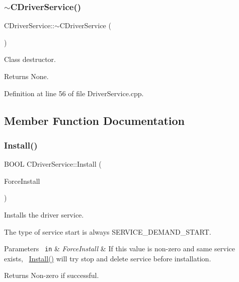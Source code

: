 \mbox{\label{class_c_driver_service_af5f00554519b7d44fe12fc9a7c968718}} 
\subsubsection{\texorpdfstring{$\sim$CDriverService()}{~CDriverService()}}
{\footnotesize\ttfamily C\+Driver\+Service\+::$\sim$\+C\+Driver\+Service (\begin{DoxyParamCaption}\item[{void}]{ }\end{DoxyParamCaption})}



Class destructor. 

\begin{DoxyReturn}{Returns}
None. 
\end{DoxyReturn}


Definition at line 56 of file Driver\+Service.\+cpp.



\subsection{Member Function Documentation}
\mbox{\label{class_c_driver_service_a82ac4ca0202256a3f27c3d38a60a8d37}} 
\subsubsection{\texorpdfstring{Install()}{Install()}}
{\footnotesize\ttfamily B\+O\+OL C\+Driver\+Service\+::\+Install (\begin{DoxyParamCaption}\item[{B\+O\+OL}]{Force\+Install }\end{DoxyParamCaption})}



Installs the driver service. 

The type of service start is always S\+E\+R\+V\+I\+C\+E\+\_\+\+D\+E\+M\+A\+N\+D\+\_\+\+S\+T\+A\+RT.


\begin{DoxyParams}[1]{Parameters}
\mbox{\texttt{ in}}  & {\em Force\+Install} & If this value is non-\/zero and same service exists,~\newline
 \mbox{\hyperlink{class_c_driver_service_a82ac4ca0202256a3f27c3d38a60a8d37}{Install()}} will try stop and delete service before installation. \\
\hline
\end{DoxyParams}
\begin{DoxyReturn}{Returns}
Non-\/zero if successful. 
\end{DoxyReturn}



